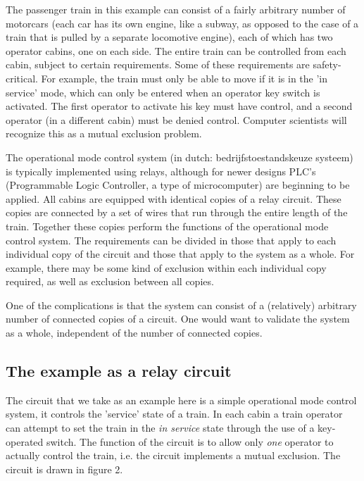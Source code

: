 The passenger train in this example can consist of a fairly arbitrary number of motorcars (each
car has its own engine, like a subway, as opposed to 
the case of a
train that is pulled by a separate locomotive engine),
each of which has two operator cabins, one on each side.
The entire train can be controlled from each cabin, subject to certain requirements.
Some of these requirements are safety-critical. For example, the train must only be able to
move if it is in the 'in service' mode, which can only be entered when an operator key switch
is activated.
The first operator to activate his key must have control, and a second operator (in a
different cabin) must be denied control. Computer scientists will recognize this as a mutual
exclusion problem. 



The operational mode control system (in dutch: bedrijfstoestandskeuze systeem) is typically
implemented using relays, although for newer designs PLC's (Programmable Logic Controller, a
type of microcomputer) are beginning to be applied.
All cabins are equipped with identical copies of a relay circuit. These copies are connected
by a set of wires that run through the entire length of the train.
Together these copies perform the functions of the operational mode control system.
The requirements can be divided in those that apply to each individual copy of the circuit 
and those that apply to the system as a whole.
For example, there may be some kind of exclusion within each individual copy required, as well
as exclusion between all copies.

One of the complications is that the system can consist of a (relatively) arbitrary number of
connected copies of a circuit.
One would want
to validate the system as a whole, independent of the number of connected
copies.


\subsection{The example as a relay circuit}

The circuit that we take as an example here is a simple operational mode control system, it
controls the 'service' state
of a train.
In each cabin a train operator can attempt to set the train in the {\em in service} state through
the use of a key-operated switch.
The function of the circuit is to allow only {\em one} operator to actually control the train,
i.e. the circuit implements a mutual exclusion.
The circuit is drawn in figure 2.

